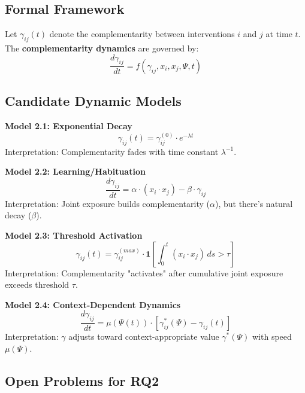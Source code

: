 \subsection{Formal Framework}

\begin{definition}
Let $\gamma_{ij}(t)$ denote the complementarity between interventions $i$ and $j$ at time $t$. The \textbf{complementarity dynamics} are governed by:
\begin{equation}
\frac{d\gamma_{ij}}{dt} = f(\gamma_{ij}, x_i, x_j, \Psi, t)
\label{eq:gamma-dynamics}
\end{equation}
\end{definition}

\subsection{Candidate Dynamic Models}

\textbf{Model 2.1: Exponential Decay}
\begin{equation}
\gamma_{ij}(t) = \gamma_{ij}^{(0)} \cdot e^{-\lambda t}
\end{equation}
Interpretation: Complementarity fades with time constant $\lambda^{-1}$.

\textbf{Model 2.2: Learning/Habituation}
\begin{equation}
\frac{d\gamma_{ij}}{dt} = \alpha \cdot (x_i \cdot x_j) - \beta \cdot \gamma_{ij}
\end{equation}
Interpretation: Joint exposure builds complementarity ($\alpha$), but there's natural decay ($\beta$).

\textbf{Model 2.3: Threshold Activation}
\begin{equation}
\gamma_{ij}(t) = \gamma_{ij}^{(max)} \cdot \mathbf{1}\left[ \int_0^t (x_i \cdot x_j) \, ds > \tau \right]
\end{equation}
Interpretation: Complementarity "activates" after cumulative joint exposure exceeds threshold $\tau$.

\textbf{Model 2.4: Context-Dependent Dynamics}
\begin{equation}
\frac{d\gamma_{ij}}{dt} = \mu(\Psi(t)) \cdot [\gamma_{ij}^*(\Psi) - \gamma_{ij}(t)]
\end{equation}
Interpretation: $\gamma$ adjusts toward context-appropriate value $\gamma^*(\Psi)$ with speed $\mu(\Psi)$.

\subsection{Open Problems for RQ2}

